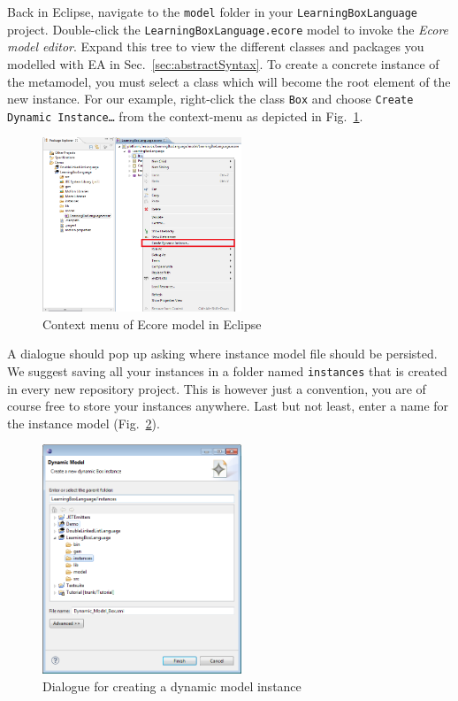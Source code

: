 Back in Eclipse, navigate to the \texttt{model} folder in your
\texttt{LearningBoxLanguage} project.  Double-click the
\texttt{LearningBoxLanguage.ecore} model to invoke  the \emph{Ecore model editor}. 
Expand this tree to view the different classes and packages you modelled with EA
in Sec.~\ref{sec:abstractSyntax}.
To create a concrete instance of the metamodel, you must select a class which
will become the root element of the new instance.
For our example, right-click the class \texttt{Box} and choose \texttt{Create
Dynamic Instance\ldots} from the context-menu as depicted in
Fig.~\ref{fig:context_menu}. 

\begin{figure}[htbp]
	\centering 
  \includegraphics[width=0.53\textwidth]{pics/modelBrowserBilder/createInstance.png} 
	\caption{Context menu of Ecore model in Eclipse}
	\label{fig:context_menu}
\end{figure}

A dialogue should pop up asking where instance model file should be persisted.
We suggest saving all your instances in a folder named \texttt{instances} that
is created in every new repository project.
This is however just a convention, you are of course free to store your
instances anywhere.
Last but not least, enter a name for the instance model
(Fig.~\ref{fig:store_dynamic_instance}). 

\begin{figure}[htbp]
	\centering 
  \includegraphics[width=0.53\textwidth]{pics/modelBrowserBilder/persistDialog.png} 
	\caption{Dialogue for creating a dynamic model instance}
	\label{fig:store_dynamic_instance}
\end{figure}
 
